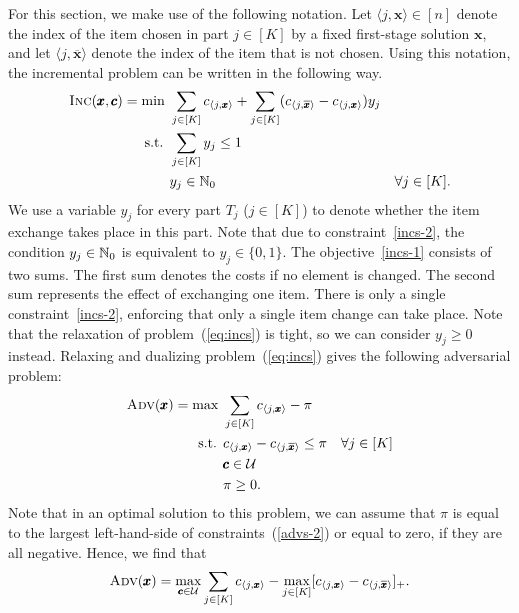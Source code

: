 For this section, we make use of the following notation. Let $\langle j,\pmb{x}\rangle\in[n]$ denote the index of the item chosen in part $j\in [K]$ by a fixed first-stage solution $\pmb{x}$, and let $\langle j,\overline{\pmb{x}}\rangle$ denote the index of the item that is not chosen. Using this notation, the incremental problem can be written in the following way.
\begin{subequations}
\label{eq:incs}  
\begin{align}
\textsc{Inc}(\pmb{x},\pmb{c}) = \min\ & \sum_{j\in[K]} c_{\langle j,\pmb{x}\rangle} + \sum_{j\in[K]} (c_{\langle j,\overline{\pmb{x}}\rangle}  - c_{\langle j, \pmb{x} \rangle}) y_j \label{incs-1} \\
\text{s.t. } & \sum_{j\in[K]} y_j \le 1 \label{incs-2}\\
& y_j \in \mathbb{N}_0 & \forall j\in[K]. \label{incs-3}
\end{align}
\end{subequations}
We use a variable $y_j$ for every part $T_j$  ($j\in[K]$) to denote whether the item exchange takes place in this part. Note that due to constraint~\eqref{incs-2}, the condition $y_j \in \mathbb{N}_0$ is equivalent to $y_j \in \{0,1\}$. The objective~\eqref{incs-1} consists of two sums. The first sum denotes the costs if no element is changed. The second sum represents the effect of exchanging one item. There is only a single constraint~\eqref{incs-2}, enforcing that only a single item change can take place. Note that the relaxation of problem~(\ref{eq:incs}) is tight, so we can consider $y_j \geq 0$ instead. Relaxing and dualizing problem~(\ref{eq:incs}) gives the following adversarial problem:
\begin{subequations}
\label{eq:advs}  
\begin{align}
\textsc{Adv}(\pmb{x}) = \max\ & \sum_{j\in[K]} c_{\langle j, \pmb{x} \rangle} - \pi \label{advs-1} \\
\text{s.t. } & c_{\langle j, \pmb{x} \rangle} - c_{\langle j, \overline{\pmb{x}}\rangle} \le \pi & \forall j\in[K] \label{advs-2}\\
& \pmb{c}\in\mathcal{U} \label{advs-3}\\
& \pi \ge 0. \label{advs-4}
\end{align}
\end{subequations}
Note that in an optimal solution to this problem, we can assume that $\pi$ is equal to the largest left-hand-side of constraints~(\ref{advs-2}) or equal to zero, if they are all negative. Hence, we find that
\begin{equation}
\textsc{Adv}(\pmb{x}) =  \max_{\pmb{c}\in\mathcal{U}} \sum_{j\in[K]} c_{\langle j, \pmb{x} \rangle} - \max_{j\in[K]} [c_{\langle j, \pmb{x} \rangle} - c_{\langle j, \overline{\pmb{x}} \rangle}]_+. 
\label{eq:adv_problem_pj_1_short}
\end{equation}

